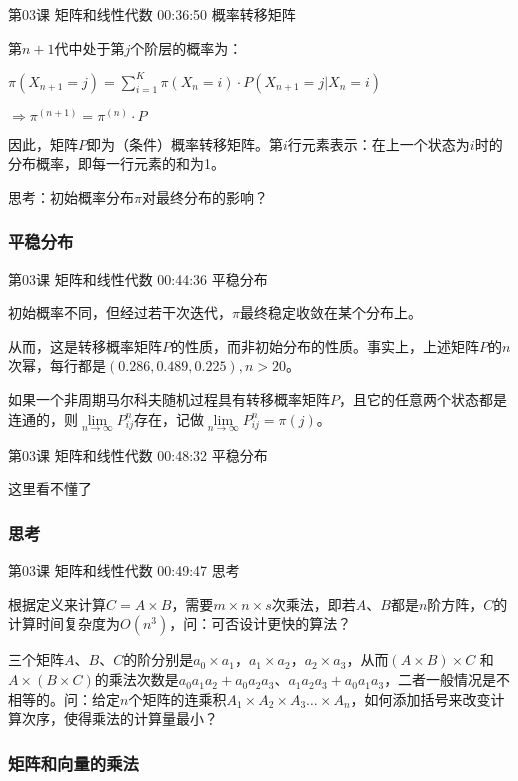 \documentclass[UTF8]{ctexart}
\begin{document}
第03课 矩阵和线性代数 00:36:50 概率转移矩阵

第$n+1$代中处于第$j$个阶层的概率为：

$\pi(X_{n+1}=j)=\sum_{i=1}^{K}\pi(X_{n}=i) \cdot P(X_{n+1}=j|X_{n}=i)$

$\Rightarrow \pi^{(n+1)}=\pi^{(n)} \cdot P$

因此，矩阵$P$即为（条件）概率转移矩阵。第$i$行元素表示：在上一个状态为$i$时的分布概率，即每一行元素的和为1。

思考：初始概率分布$\pi$对最终分布的影响？\\

\subsubsection{平稳分布}

第03课 矩阵和线性代数 00:44:36 平稳分布

初始概率不同，但经过若干次迭代，$\pi$最终稳定收敛在某个分布上。

从而，这是转移概率矩阵$P$的性质，而非初始分布的性质。事实上，上述矩阵$P$的$n$次幂，每行都是$(0.286,0.489,0.225), n > 20$。

如果一个非周期马尔科夫随机过程具有转移概率矩阵$P$，且它的任意两个状态都是连通的，则$\underset{n \rightarrow \infty }{\lim}P_{ij}^{n}$存在，记做$\underset{n \rightarrow \infty }{\lim}P_{ij}^{n}=\pi(j)$。

第03课 矩阵和线性代数 00:48:32 平稳分布

这里看不懂了

\subsubsection{思考}

第03课 矩阵和线性代数 00:49:47 思考

根据定义来计算$C=A \times B$，需要$m \times n \times s$次乘法，即若$A$、$B$都是$n$阶方阵，$C$的计算时间复杂度为$O(n^{3})$，问：可否设计更快的算法？

三个矩阵$A$、$B$、$C$的阶分别是$a_{0} \times a_{1}$，$a_{1} \times a_{2}$，$a_{2} \times a_{3}$，从而$(A \times B) \times C$ 和 $A \times (B \times C)$的乘法次数是$a_{0}a_{1}a_{2}+a_{0}a_{2}a_{3}$、$a_{1}a_{2}a_{3}+a_{0}a_{1}a_{3}$，二者一般情况是不相等的。问：给定$n$个矩阵的连乘积$A_{1} \times A_{2} \times A_{3} \dots \times A_{n}$，如何添加括号来改变计算次序，使得乘法的计算量最小？


\subsubsection{矩阵和向量的乘法}
\end{document}
